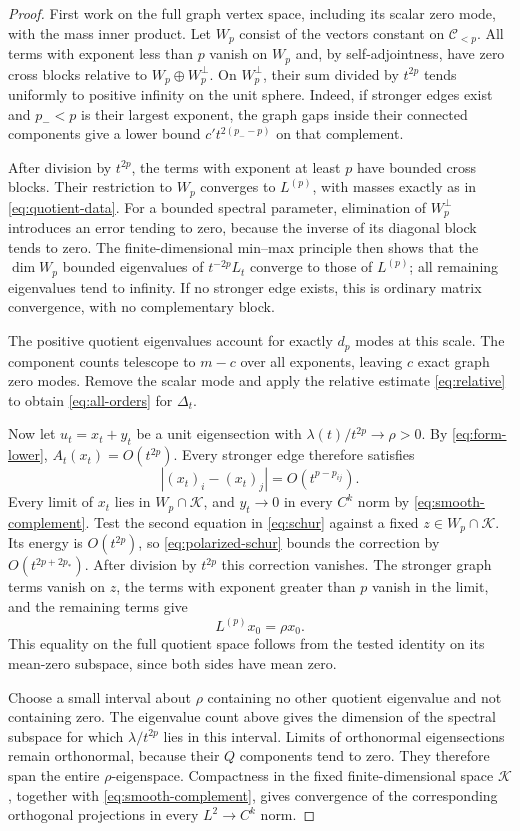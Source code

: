 \begin{proof}
First work on the full graph vertex space, including its scalar zero
mode, with the mass inner product. Let $W_p$ consist of the vectors
constant on $\mathcal C_{<p}$. All terms with exponent less than
$p$ vanish on $W_p$ and, by self-adjointness, have zero cross
blocks relative to $W_p\oplus W_p^\perp$. On
$W_p^\perp$, their sum divided by $t^{2p}$ tends uniformly
to positive infinity on the unit sphere. Indeed, if stronger edges
exist and $p_-<p$ is their largest exponent, the graph gaps
inside their connected components give a lower bound
$c't^{2(p_- -p)}$ on that complement.

After division by $t^{2p}$, the terms with exponent at least
$p$ have bounded cross blocks. Their restriction to $W_p$
converges to $L^{(p)}$, with masses exactly as in
\eqref{eq:quotient-data}. For a bounded spectral parameter, elimination
of $W_p^\perp$ introduces an error tending to zero, because the
inverse of its diagonal block tends to zero. The finite-dimensional
min--max principle then shows that the $\dim W_p$ bounded
eigenvalues of $t^{-2p}L_t$ converge to those of $L^{(p)}$;
all remaining eigenvalues tend to infinity. If no stronger edge exists,
this is ordinary matrix convergence, with no complementary block.

The positive quotient eigenvalues account for exactly $d_p$
modes at this scale. The component counts telescope to $m-c$ over all
exponents, leaving $c$ exact graph zero modes. Remove the scalar mode
and apply the relative estimate \eqref{eq:relative} to obtain
\eqref{eq:all-orders} for $\Delta_t$.

Now let $u_t=x_t+y_t$ be a unit eigensection with
$\lambda(t)/t^{2p}\to\rho>0$. By \eqref{eq:form-lower},
$A_t(x_t)=O(t^{2p})$. Every stronger edge therefore satisfies
\[
 |(x_t)_i-(x_t)_j|=O(t^{p-p_{ij}}).
\]
Every limit of $x_t$ lies in $W_p\cap\mathcal K$, and
$y_t\to0$ in every $C^k$ norm by \eqref{eq:smooth-complement}.
Test the second equation in \eqref{eq:schur} against a fixed
$z\in W_p\cap\mathcal K$. Its energy is $O(t^{2p})$, so
\eqref{eq:polarized-schur} bounds the correction by
$O(t^{2p+2p_*})$. After division by $t^{2p}$ this correction
vanishes. The stronger graph terms vanish on $z$, the terms with
exponent greater than $p$ vanish in the limit, and the remaining
terms give
\[
 L^{(p)}x_0=\rho x_0.
\]
This equality on the full quotient space follows from the tested
identity on its mean-zero subspace, since both sides have mean zero.

Choose a small interval about $\rho$ containing no other quotient
eigenvalue and not containing zero. The eigenvalue count above gives
the dimension of the spectral subspace for which
$\lambda/t^{2p}$ lies in this interval. Limits of orthonormal
eigensections remain orthonormal, because their $Q$ components tend to
zero. They therefore span the entire $\rho$-eigenspace. Compactness
in the fixed finite-dimensional space $\mathcal K$, together with
\eqref{eq:smooth-complement}, gives convergence of the corresponding
orthogonal projections in every $L^2\to C^k$ norm.
\end{proof}


